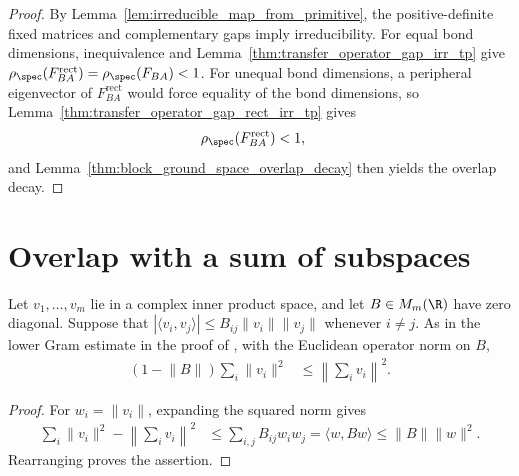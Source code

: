 \begin{proof}
    \leanok
    By Lemma~\ref{lem:irreducible_map_from_primitive}, the positive-definite
    fixed matrices and complementary gaps imply irreducibility.
    For equal bond dimensions, inequivalence and
    Lemma~\ref{thm:transfer_operator_gap_irr_tp} give
    $\rho_{\spec}(F_{BA}^{\mathrm{rect}})=\rho_{\spec}(F_{BA})<1$.
    For unequal bond dimensions, a peripheral eigenvector of
    $F_{BA}^{\mathrm{rect}}$ would force equality of the bond dimensions, so
    Lemma~\ref{thm:transfer_operator_gap_rect_irr_tp} gives
    \begin{align}
        \rho_{\spec}(F_{BA}^{\mathrm{rect}}) & <1,
    \end{align}
    and Lemma~\ref{thm:block_ground_space_overlap_decay} then yields the
    overlap decay.
\end{proof}

\section{Overlap with a sum of subspaces}

\begin{lemma}
    \label{thm:subspace_overlap_lower_gram}
    \leanok
    Let $v_1,\ldots,v_m$ lie in a complex inner product space, and let
    $B\in M_m(\R)$ have zero diagonal. Suppose that
    $|\langle v_i,v_j\rangle|\leq B_{ij}\lVert v_i\rVert\lVert v_j\rVert$
    whenever $i\neq j$. As in the lower Gram estimate in the proof of
    \cite[Lemma~9]{Nachtergaele1996Spectral}, with the Euclidean operator norm
    on $B$,
    \begin{align}
        (1-\lVert B\rVert)\sum_i\lVert v_i\rVert^2
         & \leq\left\lVert\sum_i v_i\right\rVert^2.
    \end{align}
\end{lemma}

\begin{proof}
    \leanok
    For $w_i=\lVert v_i\rVert$, expanding the squared norm gives
    \begin{align}
        \sum_i\lVert v_i\rVert^2
        -\left\lVert\sum_i v_i\right\rVert^2
         & \leq \sum_{i,j}B_{ij}w_iw_j
        =\langle w,Bw\rangle
        \leq\lVert B\rVert\lVert w\rVert^2.
    \end{align}
    Rearranging proves the assertion.
\end{proof}


